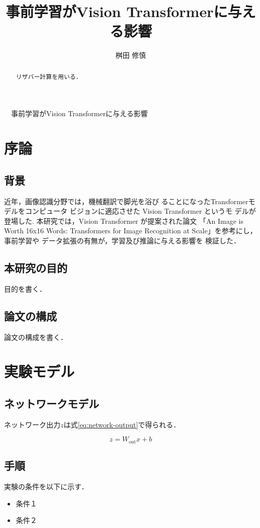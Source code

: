 \documentclass[a4paper, oneside, openany, dvipdfmx]{suribt}%
\title{事前学習がVision Transformerに与える影響}
\author{桝田 修慎}
\newcommand{\eref}[1]{式\eqref{#1}}
\begin{document}
\maketitle%
　事前学習がVision Transformerに与える影響

\frontmatter%
\begin{abstract}%
  リザバー計算\cite{jaeger2004harnessing,maass2002real}を用いる．
\end{abstract}

\tableofcontents%


\mainmatter%
\chapter{序論}
\section{背景}
近年，画像認識分野では，機械翻訳で脚光を浴び
ることになったTransformer\cite{dosovitskiy2021image}モデルをコンピュータ ビジョンに適応させた Vision Transformer というモ デルが登場した.
本研究では，Vision Transformer が提案された論文
「An Image is Worth 16x16 Words: Transformers for Image Recognition at Scale」を参考にし，事前学習や データ拡張の有無が，学習及び推論に与える影響を 検証した．
\section{本研究の目的}
目的を書く．
\section{論文の構成}
論文の構成を書く．


\chapter{実験モデル}
\section{ネットワークモデル}
ネットワーク出力$z$は\eref{eq:network-output}で得られる．

\begin{equation}
  z = W_\mathrm{out} x + b
  \label{eq:network-output}
\end{equation}

\section{手順}
実験の条件を以下に示す．
\begin{itemize}
  \item 条件１
  \item 条件２
\end{itemize}
\end{document}

